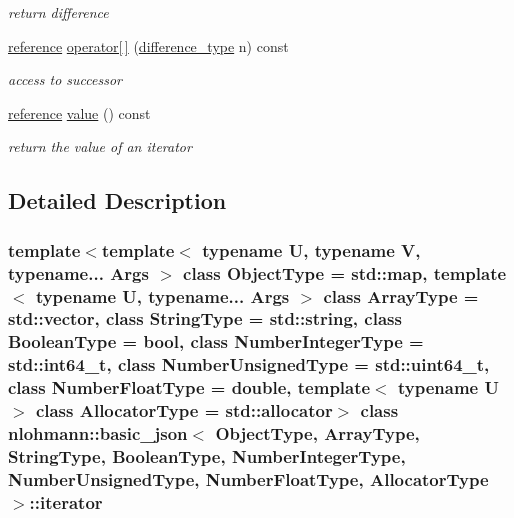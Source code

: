 \begin{DoxyCompactItemize}
\begin{DoxyCompactList}\small\item\em return difference \end{DoxyCompactList}\item 
\hypertarget{classnlohmann_1_1basic__json_1_1iterator_a72ce0abec8c72610925d83a9b309f3e4}{}\label{classnlohmann_1_1basic__json_1_1iterator_a72ce0abec8c72610925d83a9b309f3e4} 
\hyperlink{classnlohmann_1_1basic__json_1_1const__iterator_aefd248cac6493eed1e6ff53ba6a63eb2}{reference} \hyperlink{classnlohmann_1_1basic__json_1_1iterator_a72ce0abec8c72610925d83a9b309f3e4}{operator\mbox{[}$\,$\mbox{]}} (\hyperlink{classnlohmann_1_1basic__json_1_1const__iterator_a49d7c3e9ef3280df03052cce988b792f}{difference\+\_\+type} n) const
\begin{DoxyCompactList}\small\item\em access to successor \end{DoxyCompactList}\item 
\hypertarget{classnlohmann_1_1basic__json_1_1iterator_ac688806417f3b4e17c4eb1b661b522f1}{}\label{classnlohmann_1_1basic__json_1_1iterator_ac688806417f3b4e17c4eb1b661b522f1} 
\hyperlink{classnlohmann_1_1basic__json_1_1const__iterator_aefd248cac6493eed1e6ff53ba6a63eb2}{reference} \hyperlink{classnlohmann_1_1basic__json_1_1iterator_ac688806417f3b4e17c4eb1b661b522f1}{value} () const
\begin{DoxyCompactList}\small\item\em return the value of an iterator \end{DoxyCompactList}\end{DoxyCompactItemize}


\subsection{Detailed Description}
\subsubsection*{template$<$template$<$ typename U, typename V, typename... Args $>$ class Object\+Type = std\+::map, template$<$ typename U, typename... Args $>$ class Array\+Type = std\+::vector, class String\+Type = std\+::string, class Boolean\+Type = bool, class Number\+Integer\+Type = std\+::int64\+\_\+t, class Number\+Unsigned\+Type = std\+::uint64\+\_\+t, class Number\+Float\+Type = double, template$<$ typename U $>$ class Allocator\+Type = std\+::allocator$>$\newline
class nlohmann\+::basic\+\_\+json$<$ Object\+Type, Array\+Type, String\+Type, Boolean\+Type, Number\+Integer\+Type, Number\+Unsigned\+Type, Number\+Float\+Type, Allocator\+Type $>$\+::iterator}

